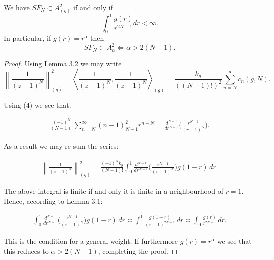 \documentclass[10pt,a4paper]{amsart}
\begin{document}
\begin{proposition}
We have \( SF_N \subset A^2_{(g)} \) if and only if
\[
\int_{0}^{1} \frac{g(r)}{r^{2N-1}} dr < \infty.
\]
In particular, if \( g(r) = r^\alpha \) then
\[
SF_N \subset A^2_{\alpha} \iff \alpha > 2(N - 1).
\]
\end{proposition}

\begin{proof}
Using Lemma 3.2 we may write
\[
\left\| \frac{1}{(z - 1)^N} \right\|^2_{(g)} =
\left\langle \frac{1}{(z - 1)^N}, \frac{1}{(z - 1)^N} \right\rangle_{(g)} = \frac{k_g}{((N-1)!)^2} \sum_{n=N}^{\infty}c_n(g,N) .
\]

Using (4) we see that:

\begin{gather*}
    \frac{(-1)^N}{(N-1)!}\sum_{n = N}^{\infty}(n-1)^2_{N-1}r^{n-N} = \frac{d^{N-1}}{dr^{N-1}}\bigg( \frac{r^{N-1}}{(r-1)^N} \bigg).
\end{gather*}

As a result we may re-sum the series:

\begin{gather*}
    \left\| \frac{1}{(z - 1)^N} \right\|^2_{(g)} = \frac{(-1)^N k_g}{(N-1)!} \int_0^1 \frac{d^{N-1}}{dr^{N-1}}\bigg( \frac{r^{N-1}}{(r-1)^N} \bigg) g(1-r) \,dr.
\end{gather*}

The above integral is finite if and only it is finite in a neighbourhood of $r=1$. Hence, according to Lemma 3.1:

\begin{gather*}
    \int_0^1 \frac{d^{N-1}}{dr^{N-1}}\bigg( \frac{r^{N-1}}{(r-1)^N} \bigg) g(1-r) \,dr \asymp \int^1 \frac{g(1-r)}{(r-1)^{2N-1}}\,dr \asymp \int_0 \frac{g(r)}{r^{2N-1}}\,dr.
\end{gather*}

This is the condition for a general weight. If furthermore $g(r) = r^{\alpha}$ we see that this reduces to \( \alpha > 2(N - 1) \), completing the proof.
\end{proof}
\end{document}
